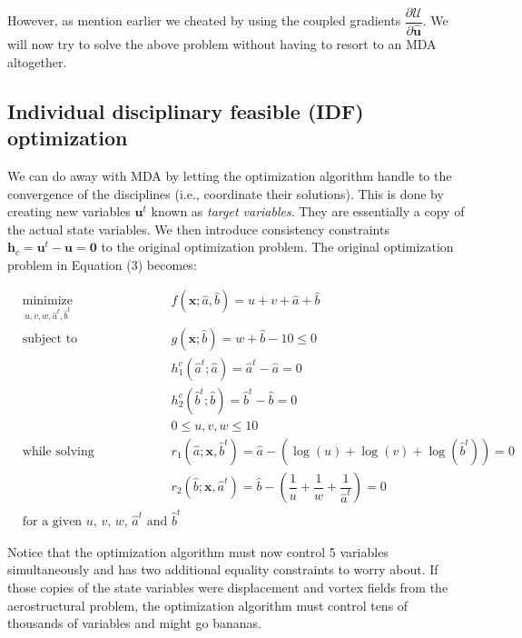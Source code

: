 \documentclass[11pt]{article}
\begin{document}
However, as mention earlier we cheated by using the coupled gradients
\(\dfrac{\partial\mathcal{U}}{\partial\hat{\mathbf{u}}}\). We will now
try to solve the above problem without having to resort to an MDA
altogether.

    \hypertarget{individual-disciplinary-feasible-idf-optimization}{%
\subsection{Individual disciplinary feasible (IDF)
optimization}\label{individual-disciplinary-feasible-idf-optimization}}

We can do away with MDA by letting the optimization algorithm handle to
the convergence of the disciplines (i.e., coordinate their solutions).
This is done by creating new variables \(\mathbf{u}^t\) known as
\emph{target variables}. They are essentially a copy of the actual state
variables. We then introduce consistency constraints
\(\mathbf{h}_c = \mathbf{u}^t - \mathbf{u} = \mathbf{0}\) to the
original optimization problem. The original optimization problem in
Equation (3) becomes:

\begin{equation*}
    \begin{aligned}
        & \underset{u,v,w,\hat{a}^t,\hat{b}^t}{\text{minimize}}
        & & f(\mathbf{x};\hat{a},\hat{b}) = u+v+\hat{a}+\hat{b}\\
        & \text{subject to}
        & & g(\mathbf{x};\hat{b}) = w + \hat{b} -10 \leq 0\\
        & & & h_1^c(\hat{a}^t;\hat{a}) = \hat{a}^t - \hat{a} = 0\\
        & & & h_2^c(\hat{b}^t;\hat{b}) = \hat{b}^t - \hat{b} = 0\\
        & & & 0 \leq u,v,w \leq 10\\
        & \text{while solving}
        & & r_1(\hat{a};\mathbf{x},\hat{b}^t) = \hat{a} - \left(\log(u) + \log(v) + \log(\hat{b}^t)\right) = 0\\
        & & & r_2(\hat{b};\mathbf{x},\hat{a}^t) = \hat{b} - \left(\dfrac{1}{u} + \dfrac{1}{w} + \dfrac{1}{\hat{a}^t}\right) = 0\\
        & \text{for a given $u$, $v$, $w$, $\hat{a}^t$ and $\hat{b}^t$}
    \end{aligned}
    \tag{6}
\end{equation*}

Notice that the optimization algorithm must now control 5 variables
simultaneously and has two additional equality constraints to worry
about. If those copies of the state variables were displacement and
vortex fields from the aerostructural problem, the optimization
algorithm must control tens of thousands of variables and might go
bananas.
\end{document}
